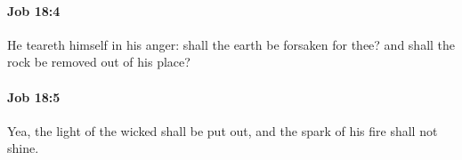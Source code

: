 		\paragraph{Job 18:4} %
			\label{JOB-18-4}

			He teareth himself in his anger: shall the earth be forsaken for thee? and shall the rock be removed out of his place?


		\paragraph{Job 18:5} %
			\label{JOB-18-5}

			Yea, the light of the wicked shall be put out, and the spark of his fire shall not shine.


